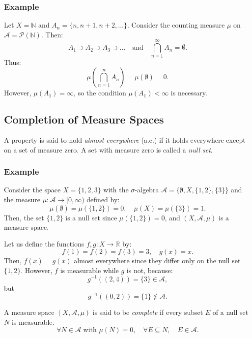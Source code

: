 \documentclass[11pt]{article}
\begin{document}
\subsubsection*{Example}
Let \(X = \mathbb{N}\) and \(A_n = \{n, n+1, n+2, \ldots\}\). Consider the counting measure \(\mu\) on \(\mathcal{A} = \mathcal{P}(\mathbb{N})\). Then:
\[A_1 \supset A_2 \supset A_3 \supset \ldots \quad \text{and} \quad \bigcap_{n=1}^{\infty} A_n = \emptyset.\]
Thus:
\[\mu\left(\bigcap_{n=1}^{\infty} A_n\right) = \mu(\emptyset) = 0.\]
However, \(\mu(A_1) = \infty\), so the condition \(\mu(A_1) < \infty\) is necessary.

\subsection{Completion of Measure Spaces}
A property is said to hold \textit{almost everywhere} (a.e.) if it holds everywhere except on a set of measure zero. A set with measure zero is called a \textit{null set}. 

\subsubsection*{Example}
Consider the space \(X = \{1, 2, 3\}\) with the \(\sigma\)-algebra \(\mathcal{A} = \{\emptyset, X, \{1, 2\}, \{3\}\}\) and the measure \(\mu: \mathcal{A} \to [0, \infty)\) defined by:
\[\mu(\emptyset) = \mu(\{1, 2\}) = 0, \quad \mu(X) = \mu(\{3\}) = 1.\]
Then, the set \(\{1, 2\}\) is a null set since \(\mu(\{1, 2\}) = 0\), and \((X, \mathcal{A}, \mu)\) is a measure space.

Let us define the functions \(f, g: X \to \mathbb{R}\) by:
\[f(1) = f(2) = f(3) = 3, \quad g(x) = x.\]
Then, \(f(x) = g(x)\) almost everywhere since they differ only on the null set \(\{1, 2\}\).
However, \(f\) is measurable while \(g\) is not, because:
\[g^{-1}((2, 4)) = \{3\} \in \mathcal{A},\]
but
\[g^{-1}((0, 2)) = \{1\} \notin \mathcal{A}.\]

A measure space \((X, \mathcal{A}, \mu)\) is said to be \textit{complete} if every subset \(E\) of a null set \(N\) is measurable. 
\[\forall N \in \mathcal{A} \text{ with } \mu(N) = 0, \quad \forall E \subseteq N, \quad E \in \mathcal{A}.\]
\end{document}

